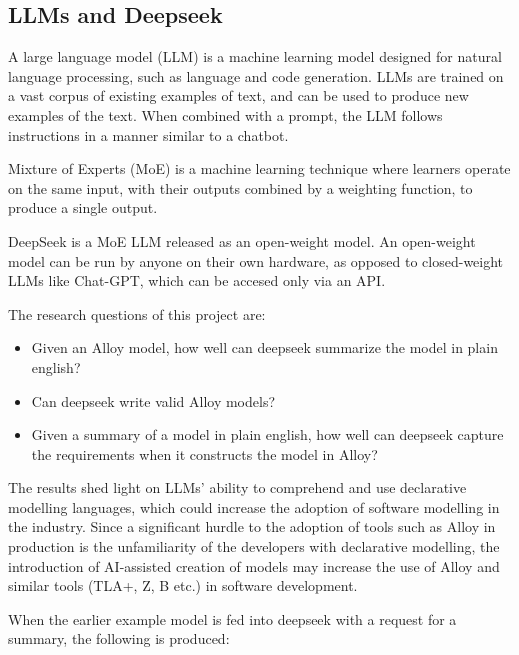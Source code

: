 \documentclass[conference]{IEEEtran}
\begin{document}
\subsection{LLMs and Deepseek}

A large language model (LLM) is a machine learning model designed for natural language processing, such as language and code generation. LLMs are trained on a vast corpus of existing examples of text, and can be used to produce new examples of the text. When combined with a prompt, the LLM follows instructions in a manner similar to a chatbot.


Mixture of Experts (MoE) is a machine learning technique where learners operate on the same input, with their outputs combined by a weighting function, to produce a single output.

DeepSeek is a MoE LLM released as an open-weight model. An open-weight model can be run by anyone on their own hardware, as opposed to closed-weight LLMs like Chat-GPT, which can be accesed only via an API. 

The research questions of this project are:

\begin{itemize}
    \item Given an Alloy model, how well can deepseek summarize the model in plain english?
    \item Can deepseek write valid Alloy models?
    \item Given a summary of a model in plain english, how well can deepseek capture the requirements when it constructs the model in Alloy?
\end{itemize}

The results shed light on LLMs' ability to comprehend and use declarative modelling languages, which could increase the adoption of software modelling in the industry. Since a significant hurdle to the adoption of tools such as Alloy in production is the unfamiliarity of the developers with declarative modelling, the introduction of AI-assisted creation of models may increase the use of Alloy and similar tools (TLA+, Z, B etc.) in software development.

When the earlier example model is fed into deepseek with a request for a summary, the following is produced:
\end{document}
